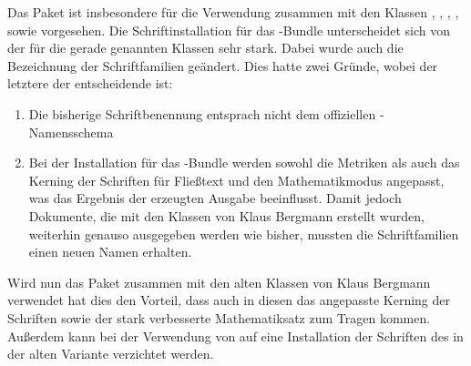 \begin{Declaration*}[v2.02]{}
Das Paket  ist insbesondere für die Verwendung zusammen 
mit den Klassen , , , 
,  sowie  vorgesehen. Die 
Schriftinstallation für das \TUDScript-Bundle unterscheidet sich von der für 
die gerade genannten Klassen sehr stark. Dabei wurde auch die Bezeichnung der 
Schriftfamilien geändert. Dies hatte zwei Gründe, wobei der letztere der 
entscheidende ist:
%
\begin{enumerate}
\item
  Die bisherige Schriftbenennung entsprach nicht dem offiziellen     
  {-Namensschema}
\item
  Bei der Installation für das \TUDScript-Bundle werden sowohl die Metriken
  als auch das Kerning der Schriften für Fließtext und den Mathematikmodus 
  angepasst, was das Ergebnis der erzeugten Ausgabe beeinflusst. Damit jedoch
  Dokumente, die mit den Klassen von Klaus Bergmann erstellt wurden, weiterhin 
  genauso ausgegeben werden wie bisher, mussten die Schriftfamilien einen neuen 
  Namen erhalten.
\end{enumerate}
%
Wird nun das Paket  zusammen mit den alten Klassen von 
Klaus Bergmann verwendet hat dies den Vorteil, dass auch in diesen das 
angepasste Kerning der Schriften sowie der stark verbesserte Mathematiksatz zum 
Tragen kommen. Außerdem kann bei der Verwendung von  auf 
eine Installation der Schriften des \CDs in der alten Variante verzichtet 
werden.
\end{Declaration*}



